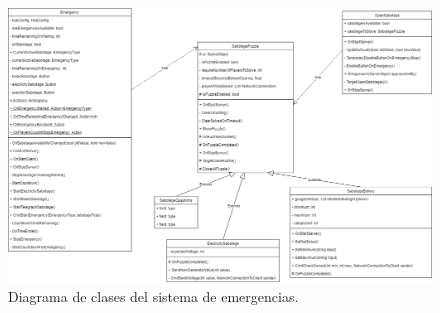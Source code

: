     \begin{figure}[H]
        \centering
        \includegraphics[width=1\linewidth]{images/DiagramaClasesEmergencias.png}
        \caption{Diagrama de clases del sistema de emergencias.}
        \label{fig:diagrama_clases_emergencias}
    \end{figure}

